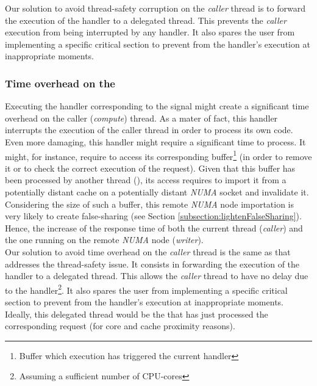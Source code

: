 			Our solution to avoid thread-safety corruption on the \emph{caller} thread is to forward the execution of the handler to a delegated thread.   This prevents the \emph{caller} execution from being interrupted by any handler.   It also spares the user from implementing a specific critical section to prevent from the handler's execution at inappropriate moments.   


		\subsubsection{Time overhead on the \notationaioComputeThread}
			Executing the handler corresponding to the \notationaio\space signal might create a significant time overhead on the caller (\emph{compute}) thread.   As a mater of fact, this handler interrupts the execution of the caller thread in order to process its own code.   Even more damaging, this handler might require a significant time to process.   It might, for instance, require to access its corresponding buffer\footnote{Buffer which execution has triggered the current handler} (in order to remove it or to check the correct execution of the \notationaio\space request).   Given that this buffer has been processed by another thread (\notationaioWriteThread), its access requires to import it from a potentially distant cache on a potentially distant \emph{NUMA} socket and invalidate it.   Considering the size of such a buffer, this remote \emph{NUMA} node importation is very likely to create false-sharing (see Section \ref{subsection:lightenFalseSharing}).   Hence, the increase of the response time of both the current thread (\emph{caller}) and the one running on the remote \emph{NUMA} node (\emph{writer}).\\

			Our solution to avoid time overhead on the \emph{caller} thread is the same as that addresses the thread-safety issue.   It consists in forwarding the execution of the handler to a delegated thread.   This allows the \emph{caller} thread to have no delay due to the handler\footnote{Assuming a sufficient number of CPU-cores}.   It also spares the user from implementing a specific critical section to prevent from the handler's execution at inappropriate moments.   Ideally, this delegated thread would be the \notationaioWriteThread\space that has just processed the corresponding request (for core and cache proximity reasons).



